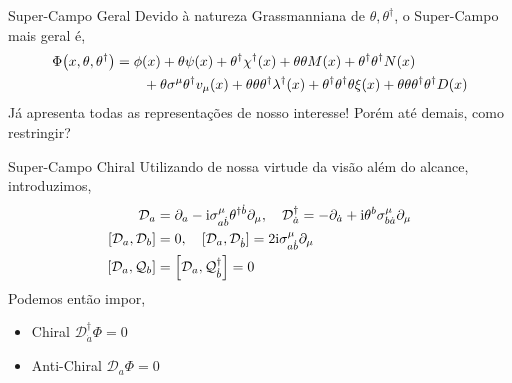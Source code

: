 \documentclass{beamer}
\begin{document}
\begin{frame}{Super-Campo Geral}
    Devido à natureza Grassmanniana de $\theta,\theta^\dagger$, o Super-Campo mais geral é,
    \begin{align*}
        \Phi\qty(x,\theta,\theta^\dagger)&=\phi\qty(x)+\theta\psi\qty(x)+\theta^\dagger\chi^\dagger\qty(x)
        +\theta\theta M\qty(x)+\theta^\dagger\theta^\dagger N\qty(x)\\ &\quad\quad+\theta\sigma^\mu\theta^\dagger v_\mu\qty(x)
        +\theta\theta\theta^\dagger\lambda^\dagger\qty(x)+\theta^\dagger\theta^\dagger\theta\xi\qty(x)+\theta\theta\theta^\dagger\theta^\dagger D\qty(x)
    \end{align*}
    Já apresenta todas as representações de nosso interesse! Porém até demais, como restringir?
\end{frame}

\begin{frame}{Super-Campo Chiral}
    Utilizando de nossa virtude da visão além do alcance, introduzimos,
    \begin{align*}
        \mathcal D_a&=\partial_a-\im\sigma^\mu_{a\dot b}\theta^{\dagger\dot b}\partial_\mu,\ \ \ \mathcal D^\dagger_{\dot a}
        =-\partial_{\dot a}+\im\theta^{b}\sigma^\mu_{b\dot a}\partial_\mu\\
        \comm{\mathcal D_a}{\mathcal D_b}&=0,\ \ \ 
        \comm{\mathcal D_a}{\mathcal D_{\dot b}}=2\im\sigma^\mu_{a\dot b}\partial_\mu\\
        \comm{\mathcal D_a}{\mathcal Q_b}&=\comm{\mathcal D_a}{\mathcal Q^\dagger_{\dot b}}=0
    \end{align*}
    Podemos então impor,
    \begin{itemize}
        \item Chiral $\mathcal D^\dagger_{\dot a}\Phi=0$
        \item Anti-Chiral $\mathcal D_a\Phi=0$
    \end{itemize}
\end{frame}
\end{document}
